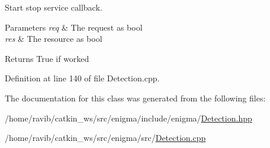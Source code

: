 Start stop service callback. 


\begin{DoxyParams}{Parameters}
{\em req} & The request as bool \\
\hline
{\em res} & The resource as bool\\
\hline
\end{DoxyParams}
\begin{DoxyReturn}{Returns}
True if worked 
\end{DoxyReturn}


Definition at line 140 of file Detection.\+cpp.



The documentation for this class was generated from the following files\+:\begin{DoxyCompactItemize}
\item 
/home/ravib/catkin\+\_\+ws/src/enigma/include/enigma/\hyperlink{_detection_8hpp}{Detection.\+hpp}\item 
/home/ravib/catkin\+\_\+ws/src/enigma/src/\hyperlink{_detection_8cpp}{Detection.\+cpp}\end{DoxyCompactItemize}
